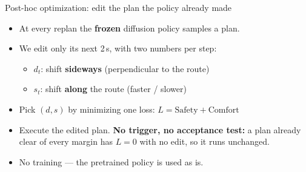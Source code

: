 \begin{frame}{Post-hoc optimization: edit the plan the policy already made}
  \begin{itemize}\itemsep6pt
    \item At every replan the \textbf{frozen} diffusion policy samples a plan.
    \item We edit only its next 2\,s, with two numbers per step:
          \begin{itemize}\itemsep2pt
            \item $d_t$: shift \textbf{sideways} (perpendicular to the route)
            \item $s_t$: shift \textbf{along} the route (faster / slower)
          \end{itemize}
    \item Pick $(d,s)$ by minimizing one loss: \quad $L = \text{Safety} + \text{Comfort}$
    \item Execute the edited plan. \textbf{No trigger, no acceptance test:}
          a plan already clear of every margin has $L=0$ with no edit, so it
          runs unchanged.
    \item No training --- the pretrained policy is used as is.
  \end{itemize}
\end{frame}

